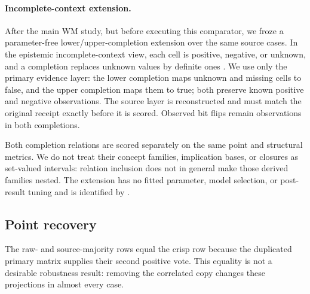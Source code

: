 \documentclass[11pt]{article}
\begin{document}
\paragraph{Incomplete-context extension.}
After the main WM study, but before executing this comparator, we froze a
parameter-free lower/upper-completion extension over the same
\WMFCACaseCount{} source cases. In the epistemic incomplete-context view, each
cell is positive, negative, or unknown, and a completion replaces unknown
values by definite ones \cite{chacongomez2026}. We use only the primary
evidence layer: the lower completion maps unknown and missing cells to false,
and the upper completion maps them to true; both preserve known positive and
negative observations. The source layer is reconstructed and must match the
original receipt exactly before it is scored. Observed bit flips remain
observations in both completions.

Both completion relations are scored separately on the same point and
structural metrics. We do not treat their concept families, implication bases,
or closures as set-valued intervals: relation inclusion does not in general
make those derived families nested. The extension has no fitted parameter,
model selection, or post-result tuning and is identified by
\WMFCAIncompleteProtocolHash.

\subsection{Point recovery}

\begin{table}[t]
\centering
\scriptsize
\caption{Descriptive means across all \WMFCACaseCount{} frozen cases. The
robust model is substantially worse; the permissive and exact-consensus models
are better on these averages. No significance test is implied.}
\label{tab:model-results}
\end{table}

The raw- and source-majority rows equal the crisp row because the duplicated
primary matrix supplies their second positive vote. This equality is not a
desirable robustness result: removing the correlated copy changes these
projections in almost every case.
\end{document}
